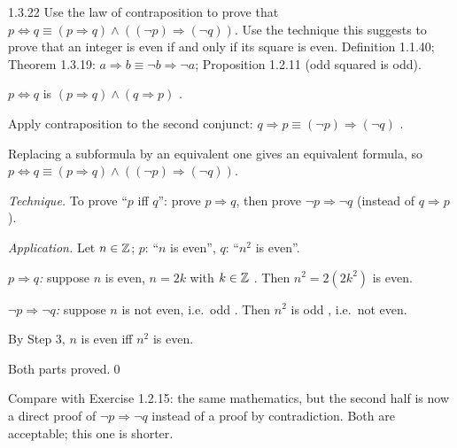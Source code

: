 \begin{bookex}[essential]{1.3.22}
Use the law of contraposition to prove that $p\Leftrightarrow q\equiv(p\Rightarrow q)\wedge((\neg p)\Rightarrow(\neg q))$. Use the technique this suggests to prove that an integer is even if and only if its square is even.
\solution
\given Definition 1.1.40; Theorem 1.3.19: $a\Rightarrow b\equiv\neg b\Rightarrow\neg a$; Proposition 1.2.11 (odd squared is odd).
\begin{steps}
\item $p\Leftrightarrow q$ is $(p\Rightarrow q)\wedge(q\Rightarrow p)$ .
\item Apply contraposition to the second conjunct: $q\Rightarrow p\equiv(\neg p)\Rightarrow(\neg q)$ .
\item Replacing a subformula by an equivalent one gives an equivalent formula, so $p\Leftrightarrow q\equiv(p\Rightarrow q)\wedge((\neg p)\Rightarrow(\neg q))$.
\item \emph{Technique.} To prove ``$p$ iff $q$'': prove $p\Rightarrow q$, then prove $\neg p\Rightarrow\neg q$ (instead of $q\Rightarrow p$).
\item \emph{Application.} Let $n\in\mathbb{Z}$; $p$: ``$n$ is even'', $q$: ``$n^2$ is even''.
\item \emph{$p\Rightarrow q$:} suppose $n$ is even, $n=2k$ with $k\in\mathbb{Z}$ . Then $n^2=2(2k^2)$ is even.
\item \emph{$\neg p\Rightarrow\neg q$:} suppose $n$ is not even, i.e.\ odd . Then $n^2$ is odd , i.e.\ not even.
\item By Step 3, $n$ is even iff $n^2$ is even.
\end{steps}
\conclusion Both parts proved.\qed
\begin{compare}
\item Compare with Exercise 1.2.15: the same mathematics, but the second half is now a direct proof of $\neg p\Rightarrow\neg q$ instead of a proof by contradiction. Both are acceptable; this one is shorter.
\end{compare}
\end{bookex}

